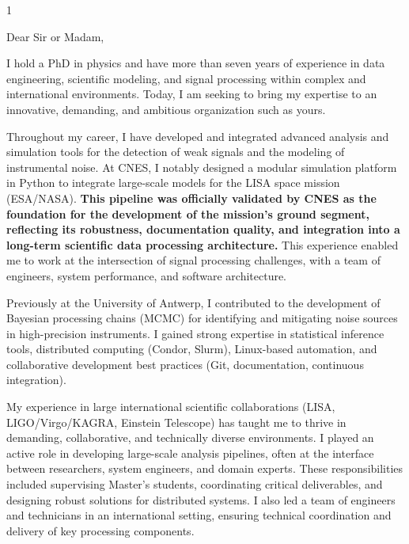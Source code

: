 \documentclass[10pt,a4paper]{../_shared/altacv}
\begin{document}
\makecvheader


\begin{paracol}{1}



{\color{body}

Dear Sir or Madam,

I hold a PhD in physics and have more than seven years of experience in data engineering, scientific modeling, and signal processing within complex and international environments. Today, I am seeking to bring my expertise to an innovative, demanding, and ambitious organization such as yours.

Throughout my career, I have developed and integrated advanced analysis and simulation tools for the detection of weak signals and the modeling of instrumental noise. At CNES, I notably designed a modular simulation platform in Python to integrate large-scale models for the LISA space mission (ESA/NASA). \textbf{This pipeline was officially validated by CNES as the foundation for the development of the mission's ground segment, reflecting its robustness, documentation quality, and integration into a long-term scientific data processing architecture.} This experience enabled me to work at the intersection of signal processing challenges, with a team of engineers, system performance, and software architecture.

Previously at the University of Antwerp, I contributed to the development of Bayesian processing chains (MCMC) for identifying and mitigating noise sources in high-precision instruments. I gained strong expertise in statistical inference tools, distributed computing (Condor, Slurm), Linux-based automation, and collaborative development best practices (Git, documentation, continuous integration).

My experience in large international scientific collaborations (LISA, LIGO/Virgo/KAGRA, Einstein Telescope) has taught me to thrive in demanding, collaborative, and technically diverse environments. I played an active role in developing large-scale analysis pipelines, often at the interface between researchers, system engineers, and domain experts. These responsibilities included supervising Master’s students, coordinating critical deliverables, and designing robust solutions for distributed systems. I also led a team of engineers and technicians in an international setting, ensuring technical coordination and delivery of key processing components.

}
\end{paracol}
\end{document}
